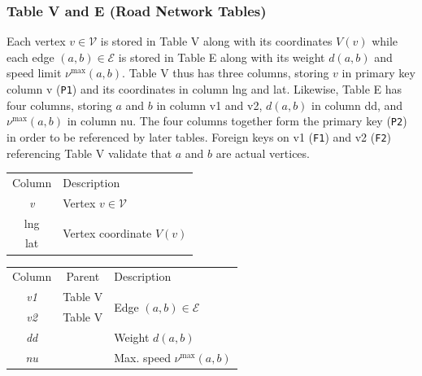 \documentclass{article}
\theoremstyle{definition}                   %
\begin{document}
\subsubsection{Table V and E (Road Network Tables)}
Each vertex $v\in\mathcal{V}$ is stored in Table V along with its coordinates
$V(v)$ while each edge $(a,b)\in\mathcal{E}$ is stored in Table E along with
its weight $d(a,b)$ and speed limit $\nu^\textrm{max}(a,b)$.  Table V thus has
three columns, storing $v$ in primary key column \textsf{v} ({\tt{}P1}) and its
coordinates in column \textsf{lng} and \textsf{lat}.  Likewise, Table E has
four columns, storing $a$ and $b$ in column \textsf{v1} and \textsf{v2},
$d(a,b)$ in column \textsf{dd}, and $\nu^\textrm{max}(a,b)$ in column
\textsf{nu}.  The four columns together form the primary key ({\tt{}P2}) in order
to be referenced by later tables.  Foreign keys on \textsf{v1} ({\tt{}F1}) and
\textsf{v2} ({\tt{}F2}) referencing Table V validate that $a$ and $b$ are actual
vertices.
\begin{table}[h]
\centering
\small
\begin{tabular}{|c|l|}
\hline
\rowcolor{TableTitle}
\multicolumn{2}{|c|}{Table V (Vertices)}\\
\hline
\rowcolor{TableHeader}
Column & Description\\
\hline
\textit{v} & Vertex $v\in\mathcal{V}$\\
\hline
lng & \multirow{2}{*}{Vertex coordinate $V(v)$}\\
lat & \\
\hline
\end{tabular}
\begin{tabular}{|c|c|l|}
\hline
\rowcolor{TableTitle}
\multicolumn{3}{|c|}{Table E (Edges)}\\
\hline
\rowcolor{TableHeader}
Column & Parent & Description\\
\hline
\textit{v1} & Table V & \multirow{2}{*}{Edge $(a, b)\in\mathcal{E}$} \\
\cline{2-2}
\textit{v2} & Table V & \\
\hline
\textit{dd} & & Weight $d(a,b)$\\
\hline
\textit{nu} & & Max. speed $\nu^\textrm{max}(a,b)$\\
\hline
\end{tabular}
\end{table}
\nwenddocs{}\endmoddef{}
\end{document}
